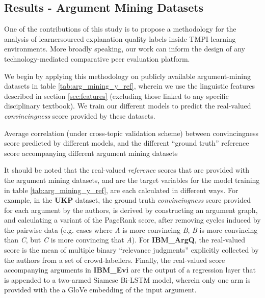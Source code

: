 \documentclass[notitlepage,12pt]{jedm}
\begin{document}
\subsection{Results - Argument Mining Datasets}
One of the contributions of this study is to propose a methodology for the 
analysis of learnersourced explanation quality labels inside 
TMPI learning environments. 
More broadly speaking, our work can inform the design of any 
technology-mediated comparative peer evaluation platform. 

We begin by applying this methodology on publicly available argument-mining 
datasets in table \ref{tab:arg_mining_y_ref}, wherein we use the linguistic 
features described in section \ref{sec:features} (excluding those linked to any 
specific disciplinary textbook).
We train our different models to predict the real-valued 
\textit{convincingness} score provided by these datasets.

\begin{table}[H]
	\parbox{.45\linewidth}{
		\centering
		
	}
	\hfill
	\parbox{.45\linewidth}{
		\centering
		
	}
\caption{Average correlation (under cross-topic validation scheme) between
	convincingness score predicted by different models, and the different 
	``ground truth'' reference score accompanying different argument mining 
	datasets}
\label{tab:arg_mining_y_ref}
\end{table}

It should be noted that the real-valued \textit{reference} scores that are 
provided with the argument mining datasets, and are the target variables for 
the model training in table \ref{tab:arg_mining_y_ref}, are each 
calculated in different ways. 
For example, in the \textbf{UKP} dataset, the ground truth 
\textit{convincingness} score provided for each argument by the authors, is 
derived by constructing an argument graph, and calculating a variant of the 
PageRank score, after removing cycles induced by the pairwise data (e.g. cases 
where \textit{A} is more convincing \textit{B}, \textit{B} is more convincing 
than \textit{C}, but \textit{C} is more convincing that \textit{A}).
For \textbf{IBM\_ArgQ}, the real-valued score is the mean of multiple binary 
``relevance judgments'' explicitly collected by the authors from a set of 
crowd-labellers.
Finally, the real-valued score accompanying arguments in \textbf{IBM\_Evi} are 
the output of a regression layer that is appended to a two-armed Siamese 
Bi-LSTM model, wherein only one arm is provided with the a GloVe embedding of 
the input argument.
\end{document}
